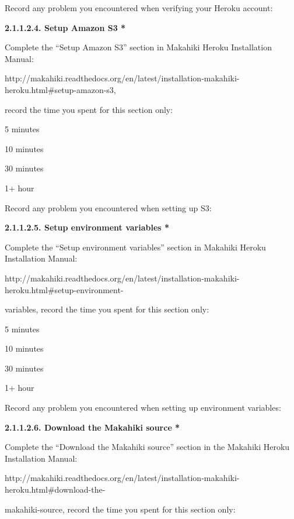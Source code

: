 Record any problem you encountered when verifying your Heroku account: \underline{\hspace{3cm}}

{\bf 2.1.1.2.4. Setup Amazon S3 *}

Complete the ``Setup Amazon S3'' section in Makahiki Heroku Installation Manual:

http://makahiki.readthedocs.org/en/latest/installation-makahiki-heroku.html\#setup-amazon-s3, 

record the time you spent for this section only:

\begin{radiobutton}
\item 5 minutes
\item  10 minutes
\item  30 minutes
\item  1+ hour
\end{radiobutton}

Record any problem you encountered when setting up S3: \underline{\hspace{4cm}}

{\bf 2.1.1.2.5. Setup environment variables *}

Complete the ``Setup environment variables'' section in Makahiki Heroku Installation Manual:

http://makahiki.readthedocs.org/en/latest/installation-makahiki-heroku.html\#setup-environment-

variables, record the time you spent for this section only:

\begin{radiobutton}
\item 5 minutes
\item  10 minutes
\item  30 minutes
\item  1+ hour
\end{radiobutton}

Record any problem you encountered when setting up environment variables: \underline{\hspace{2cm}}

{\bf 2.1.1.2.6. Download the Makahiki source *}

Complete the ``Download the Makahiki source'' section in the Makahiki Heroku Installation Manual:

http://makahiki.readthedocs.org/en/latest/installation-makahiki-heroku.html\#download-the-

makahiki-source,  record the time you spent for this section only:

